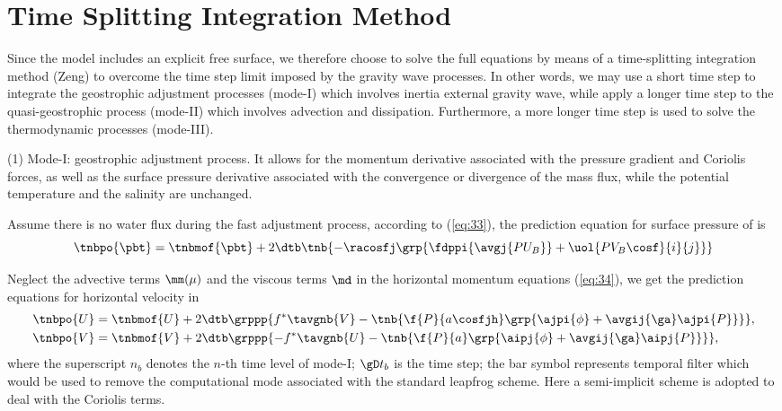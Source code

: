 
\section{Time Splitting Integration Method}

Since the model includes an explicit free surface, we therefore choose
to solve the full equations by means of a time-splitting integration
method (Zeng) to overcome the time step limit imposed by the gravity
wave processes. In other words, we may use a short time step to integrate
the geostrophic adjustment processes (mode-\mbox{I}) which involves
inertia external gravity wave, while apply a longer time step to the
quasi-geostrophic process (mode-\mbox{II}) which involves advection
and dissipation. Furthermore, a more longer time step is used to solve
the thermodynamic processes (mode-\mbox{III}).

(1) Mode-\mbox{I}: geostrophic adjustment process. It allows for the
momentum derivative associated with the pressure gradient and Coriolis
forces, as well as the surface pressure derivative associated with
the convergence or divergence of the mass flux, while the potential
temperature and the salinity are unchanged. 

Assume there is no water flux during the fast adjustment process, according to
(\ref{eq:33}), the prediction equation for surface pressure of \modo is
\begin{equation}
  \tnbpo{\pbt} = \tnbmof{\pbt} + 2\dtb \tnb{ -\racosfj \grp{\fdppi{\avgj{PU_B}} +
  \uol{PV_B\cosf}{i}{j}} }
\end{equation}

Neglect the advective terms $\mm(\mu)$ and the viscous terms $\md$ in the
horizontal momentum equations (\ref{eq:34}), we get the prediction equations for
horizontal velocity in \modo
\bese
\begin{align}
  \tnbpo{U} &= \tnbmof{U} + 2\dtb \grppp{ f^{*}\tavgnb{V} -\tnb{\f{P}{a\cosfjh} \grp{
  \ajpi{\phi} + \avgij{\ga}\ajpi{P} } }},\\
  \tnbpo{V} &= \tnbmof{V} + 2\dtb \grppp{ -f^{*}\tavgnb{U} -\tnb{\f{P}{a} \grp{
  \aipj{\phi} + \avgij{\ga}\aipj{P} } }},
\end{align}
\ense
where the superscript $n_{b}$ denotes the $n$-th time level of mode-\mbox{I};
$\gD t_{b}$ is the time step; the bar symbol represents temporal
filter \citep{Asselin1972} which would be used to remove the computational
mode associated with the standard leapfrog scheme.
Here a semi-implicit scheme is adopted to deal with the Coriolis terms.

